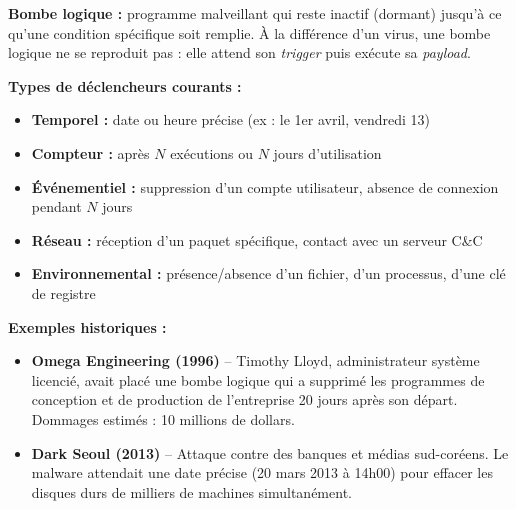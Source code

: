 \documentclass[a4paper,11pt]{article}
\theoremstyle{plain}
\theoremstyle{definition}
\begin{document}
\begin{rappel}
\textbf{Bombe logique :} programme malveillant qui reste inactif (dormant) jusqu'à ce qu'une condition spécifique soit remplie. À la différence d'un virus, une bombe logique ne se reproduit pas : elle attend son \textit{trigger} puis exécute sa \textit{payload}.

\medskip
\textbf{Types de déclencheurs courants :}
\begin{itemize}
    \item \textbf{Temporel :} date ou heure précise (ex : le 1er avril, vendredi 13)
    \item \textbf{Compteur :} après $N$ exécutions ou $N$ jours d'utilisation
    \item \textbf{Événementiel :} suppression d'un compte utilisateur, absence de connexion pendant $N$ jours
    \item \textbf{Réseau :} réception d'un paquet spécifique, contact avec un serveur C\&C
    \item \textbf{Environnemental :} présence/absence d'un fichier, d'un processus, d'une clé de registre
\end{itemize}

\medskip
\textbf{Exemples historiques :}
\begin{itemize}
    \item \textbf{Omega Engineering (1996)} -- Timothy Lloyd, administrateur système licencié, avait placé une bombe logique qui a supprimé les programmes de conception et de production de l'entreprise 20 jours après son départ. Dommages estimés : 10 millions de dollars.
    \item \textbf{Dark Seoul (2013)} -- Attaque contre des banques et médias sud-coréens. Le malware attendait une date précise (20 mars 2013 à 14h00) pour effacer les disques durs de milliers de machines simultanément.
\end{itemize}
\end{rappel}
\end{document}
